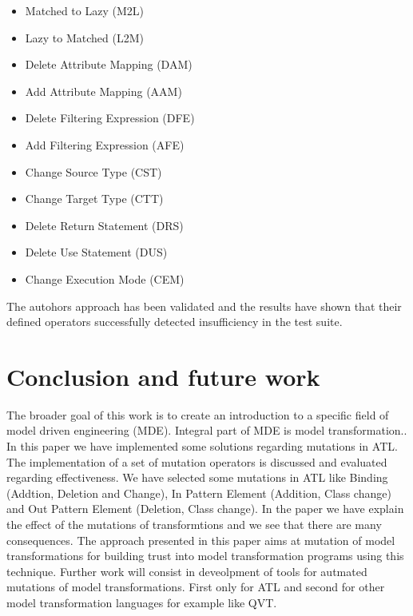 \documentclass{llncs}
\begin{document}
\begin{itemize}
	\item Matched to Lazy (M2L)
	\item Lazy to Matched (L2M)
	\item Delete Attribute Mapping (DAM)
	\item Add Attribute Mapping (AAM)
	\item Delete Filtering Expression (DFE)
	\item Add Filtering Expression (AFE)
	\item Change Source Type (CST)
	\item Change Target Type (CTT)
	\item Delete Return Statement (DRS)
	\item Delete Use Statement (DUS)
	\item Change Execution Mode (CEM)
\end{itemize}

The autohors approach has been validated and the results have shown that their
defined operators successfully detected insufficiency in the test suite.

\section{Conclusion and future work}
The broader goal of this work is to create an introduction to a specific field
of model driven engineering (MDE). Integral part of MDE is model transformation.\cite{Sendall:2003}. In this paper we have implemented some solutions regarding mutations in ATL. The implementation of a set of mutation operators is discussed and evaluated regarding effectiveness. We have selected some mutations in ATL like Binding (Addtion, Deletion and Change), In Pattern Element (Addition, Class change) and Out Pattern Element (Deletion, Class change). In the paper we have explain the effect of the mutations of transformtions and we see that there are many consequences. The approach presented in this paper aims at mutation of model transformations for building trust into model transformation programs using this technique. Further work will consist in deveolpment of tools for autmated mutations of model transformations. First only for ATL and second for other model transformation languages for example like QVT.



\end{document}
